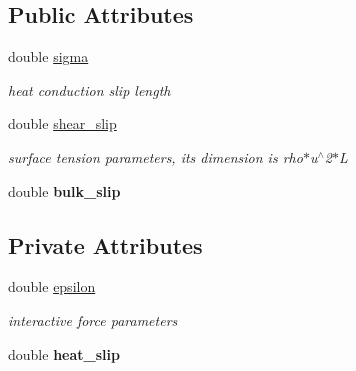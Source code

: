 \subsection*{Public Attributes}
\begin{CompactItemize}
\item 
\hypertarget{classForce_7142842359bf1e78499b5f59cff7a600}{
double \hyperlink{classForce_7142842359bf1e78499b5f59cff7a600}{sigma}}
\label{classForce_7142842359bf1e78499b5f59cff7a600}

\begin{CompactList}\small\item\em heat conduction slip length \item\end{CompactList}\item 
\hypertarget{classForce_5b371059110b1baee895f30c24e209f3}{
double \hyperlink{classForce_5b371059110b1baee895f30c24e209f3}{shear\_\-slip}}
\label{classForce_5b371059110b1baee895f30c24e209f3}

\begin{CompactList}\small\item\em surface tension parameters, its dimension is rho$\ast$u$^\wedge$2$\ast$L \item\end{CompactList}\item 
\hypertarget{classForce_707dd63d90d41bd1c0b345f5ba27a047}{
double \textbf{bulk\_\-slip}}
\label{classForce_707dd63d90d41bd1c0b345f5ba27a047}

\end{CompactItemize}
\subsection*{Private Attributes}
\begin{CompactItemize}
\item 
\hypertarget{classForce_ff0b02789964024867fd633fd0e5722a}{
double \hyperlink{classForce_ff0b02789964024867fd633fd0e5722a}{epsilon}}
\label{classForce_ff0b02789964024867fd633fd0e5722a}

\begin{CompactList}\small\item\em interactive force parameters \item\end{CompactList}\item 
\hypertarget{classForce_499d60a627ddd2b9a2909891cd45b78f}{
double \textbf{heat\_\-slip}}
\label{classForce_499d60a627ddd2b9a2909891cd45b78f}

\end{CompactItemize}
